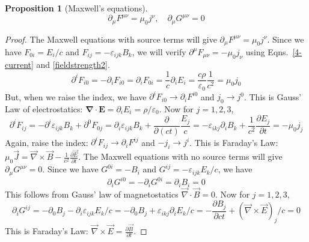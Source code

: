 \documentclass[a4paper]{article}
\theoremstyle{new}
\newtheorem{prop}{Proposition}[section]
\begin{document}
\begin{prop}[Maxwell's equations]
\begin{equation}
\partial_\mu F^{\mu\nu}=\mu_0j^\nu,\quad\partial_\mu G^{\mu\nu}=0\label{Maxwell}
\end{equation}
\end{prop}
\begin{proof}
The Maxwell equations with source terms will give $\partial_\mu F^{\mu\nu}=\mu_0j^\nu$. Since we have $F_{0i}=E_i/c$ and $F_{ij}=-\varepsilon_{ijk}B_k$, we will verify $\partial^\mu F_{\mu\nu}=-\mu_0j_\nu$ using Eqns.~\ref{4-current} and \ref{fieldstrength2}.
$$\partial^iF_{i0}=-\partial_iF_{i0}=\partial_iF_{0i}=\frac{1}{c}\partial_iE_i=\frac{c\rho}{\varepsilon_0}\frac{1}{c^2}=\mu_0j_0$$
But, when we raise the index, we have $\partial^iF_{i0}\rightarrow\partial_iF^{i0}$ and $j_0\rightarrow j^0$. This is Gauss' Law of electrostatics: $\boldsymbol{\nabla}\cdot\mathbf{E}=\partial_iE_i=\rho/\varepsilon_0$. Now for $j=1,2,3$,
$$\partial^iF_{ij}=-\partial^i\varepsilon_{ijk}B_k+\partial^0F_{0j}=\partial_i\varepsilon_{ijk}B_k+\frac{\partial}{\partial(ct)}\frac{E_j}{c}=-\varepsilon_{ikj}\partial_iB_k+\frac{1}{c^2}\frac{\partial E_j}{\partial t}=-\mu_0j_j$$
Again, raise the index: $\partial^iF_{ij}\rightarrow\partial_iF^{ij}$ and $-j_i\rightarrow j^i$. This is Faraday's Law: $\mu_0\vec{J}=\vec{\nabla}\times\vec{B}-\frac{1}{c^2}\frac{\partial\vec{E}}{\partial t}$. The Maxwell equations with no source terms will give $\partial_\mu G^{\mu\nu}=0$. Since we have $G^{0i}=-B_i$ and $G^{ij}=-\varepsilon_{ijk}E_k/c$, we have
$$\partial_iG^{i0}=-\partial_iG^{0i}=\partial_iB_i=0$$
This follows from Gauss' law of magnetostatics $\vec{\nabla}\cdot\vec{B}=0$. Now for $j=1,2,3$,
$$\partial_iG^{ij}=-\partial_0B_j-\partial_i\varepsilon_{ijk}E_k/c=-\partial_0B_j+\varepsilon_{ikj}\partial_iE_k/c=-\frac{\partial B_j}{\partial ct}+(\vec{\nabla}\times\vec{E})_j/c=0$$
This is Faraday's Law: $\vec{\nabla}\times\vec{E}=\frac{\partial\vec{B}}{\partial t}$.
\end{proof}
\end{document}
